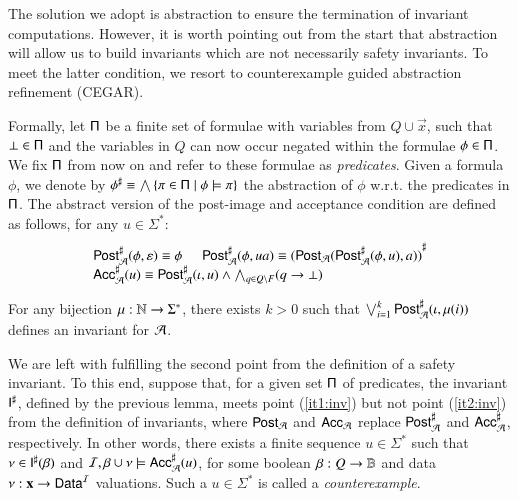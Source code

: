 \documentclass[10pt,conference,letterpaper,twocolumn]{IEEEtran}
\begin{document}
The solution we adopt is abstraction to ensure the termination of
invariant computations. However, it is worth pointing out from the
start that abstraction will allow us to build invariants which are not
necessarily safety invariants. To meet the latter condition, we resort
to counterexample guided abstraction refinement (CEGAR).

Formally, let $\mathsf{\Pi}$ be a finite set of formulae with variables from
$Q \cup \vec{x}$, such that $\bot \in \mathsf{\Pi}$ and the variables in $Q$
can now occur negated within the formulae $\phi \in \mathsf{\Pi}$. We fix
$\mathsf{\Pi}$ from now on and refer to these formulae as
\emph{predicates}. Given a formula $\phi$, we denote by ${\phi}^\sharp
\equiv \bigwedge \left\{ \pi \in \mathsf{\Pi} \mid \phi \models \pi \right\}$ the
abstraction of $\phi$ w.r.t. the predicates in $\mathsf{\Pi}$. The abstract
version of the post-image and acceptance condition are defined as
follows, for any $u \in \Sigma^*$:
\[\begin{array}{l}
{\mathsf{Post}}^\sharp_{\mathcal{A}}(\phi,\varepsilon) \equiv \phi \hspace*{5mm}
{\mathsf{Post}}^\sharp_{\mathcal{A}}(\phi,ua) \equiv {(\mathsf{Post}_{\mathcal{A}}({\mathsf{Post}}^\sharp_{\mathcal{A}}(\phi,u),a))}^\sharp \\
{\mathsf{Acc}}^\sharp_{\mathcal{A}}(u) \equiv {\mathsf{Post}}^\sharp_{\mathcal{A}}(\iota,u) \wedge \bigwedge_{q \in Q \setminus F} 
(q \rightarrow \bot)
\end{array}\]
\begin{lemma}\label{lemma:abstract-invariant}
  For any bijection $\mu : {\bf \mathbb{N}} \rightarrow \Sigma^*$, there exists
  $k>0$ such that $\bigvee_{i=1}^k {\mathsf{Post}}^\sharp_{\mathcal{A}}(\iota,\mu(i))$ defines
  an invariant for $\mathcal{A}$. 
\end{lemma}

We are left with fulfilling the second point from the definition of a
safety invariant. To this end, suppose that, for a given set $\mathsf{\Pi}$
of predicates, the invariant ${\mathsf{I}}^\sharp$, defined by the previous
lemma, meets point (\ref{it1:inv}) but not point (\ref{it2:inv}) from
the definition of invariants, where $\mathsf{Post}_{\mathcal{A}}$ and $\mathsf{Acc}_{\mathcal{A}}$
replace ${\mathsf{Post}}^\sharp_{\mathcal{A}}$ and ${\mathsf{Acc}}^\sharp_{\mathcal{A}}$, respectively. In
other words, there exists a finite sequence $u \in \Sigma^*$ such that
$\nu \in {\mathsf{I}}^\sharp(\beta)$ and $\mathcal{I},\beta\cup\nu \models
{\mathsf{Acc}}^\sharp_{\mathcal{A}}(u)$, for some boolean $\beta : Q \rightarrow \mathbb{B}$
and data $\nu : \mathbf x \rightarrow \mathsf{Data}^{\mathcal{I}}$ valuations. Such
a $u\in\Sigma^*$ is called a \emph{counterexample}.
\end{document}
